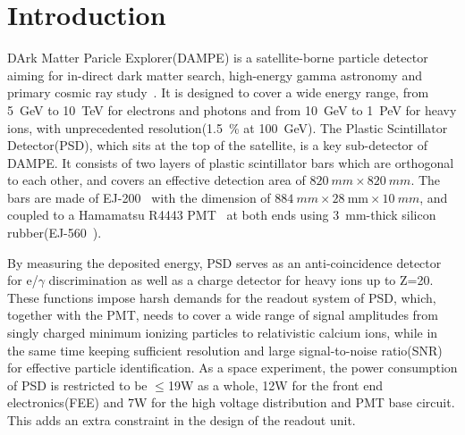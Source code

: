 \documentclass[5p, times]{elsarticle}
\begin{document}
\linenumbers
\section{Introduction}
\label{sec:introduction}

DArk Matter Paricle Explorer(DAMPE) is a satellite-borne particle detector aiming for in-direct dark matter search, high-energy gamma astronomy and primary cosmic ray study~\cite{Chang_Jin_dampe}.
It is designed to cover a wide energy range, from \SI{5}{GeV} to \SI{10}{TeV} for electrons and photons and from \SI{10}{GeV} to \SI{1}{PeV} for heavy ions, with unprecedented resolution(\SI{1.5}{\percent} at \SI{100}{\giga\electronvolt}).
The Plastic Scintillator Detector(PSD), which sits at the top of the satellite, is a key sub-detector of DAMPE.
It consists of two layers of plastic scintillator bars which are orthogonal to each other, and covers an effective detection area of $\SI{820}{mm}\times\SI{820}{mm}$.
The bars are made of EJ-200~\cite{scintillator} with the dimension of $\SI{884}{mm} \times \SI{28}{\milli\meter} \times \SI{10}{mm}$, and coupled to a Hamamatsu R4443 PMT~\cite{r4443} at both ends using \SI{3}{mm}-thick silicon rubber(EJ-560~\cite{scintillator}).

By measuring the deposited energy, PSD serves as an anti-coincidence detector for e/$\gamma$ discrimination as well as a charge detector for heavy ions up to Z=20.
These functions impose harsh demands for the readout system of PSD, which, together with the PMT, needs to cover a wide range of signal amplitudes from singly charged minimum ionizing particles to relativistic calcium ions, while in the same time keeping sufficient resolution and large signal-to-noise ratio(SNR) for effective particle identification.   
As a space experiment, the power consumption of PSD is restricted to be $\leq$19W as a whole, 12W for the front end electronics(FEE) and 7W for the high voltage distribution and PMT base circuit.
This adds an extra constraint in the design of the readout unit.
\end{document}
